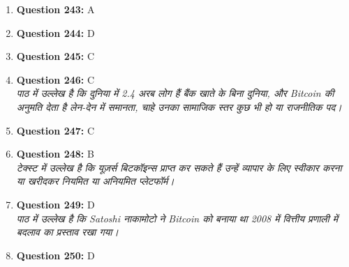 \documentclass[12pt,a4paper]{article}
\begin{document}
\begin{enumerate}
\item \textbf{Question 243:} A

\item \textbf{Question 244:} D

\item \textbf{Question 245:} C

\item \textbf{Question 246:} C
\\ \textit{पाठ में उल्लेख है कि दुनिया में 2.4 अरब लोग हैं बैंक खाते के बिना दुनिया, और Bitcoin की अनुमति देता है लेन-देन में समानता, चाहे उनका सामाजिक स्तर कुछ भी हो या राजनीतिक पद।}

\item \textbf{Question 247:} C

\item \textbf{Question 248:} B
\\ \textit{टेक्स्ट में उल्लेख है कि यूज़र्स बिटकॉइन्स प्राप्त कर सकते हैं उन्हें व्यापार के लिए स्वीकार करना या खरीदकर नियमित या अनियमित प्लेटफॉर्म।}

\item \textbf{Question 249:} D
\\ \textit{पाठ में उल्लेख है कि Satoshi नाकामोटो ने Bitcoin को बनाया था 2008 में वित्तीय प्रणाली में बदलाव का प्रस्ताव रखा गया।}

\item \textbf{Question 250:} D


\end{enumerate}
\end{document}
